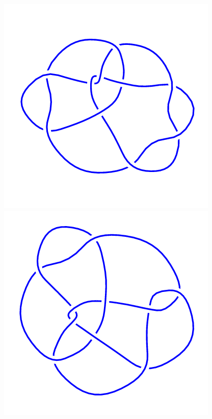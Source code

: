 \begin{figure}[H]
\begin{minipage}[b]{.18\linewidth}
    \end{minipage}
    \begin{minipage}[b]{.18\linewidth}
        \centering
        \includegraphics[width=\linewidth]{../data/10_94.png}
    \end{minipage}
    \begin{minipage}[b]{.18\linewidth}
        \centering
        \includegraphics[width=\linewidth]{../data/10_95.png}

\end{minipage}
\end{figure}
